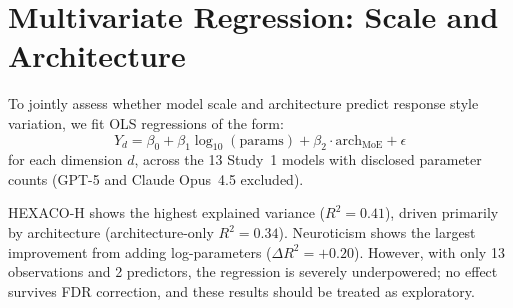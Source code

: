 \documentclass[11pt]{article}
\begin{document}
\section{Multivariate Regression: Scale and Architecture}
\label{sec:appendix_regression}

To jointly assess whether model scale and architecture predict response style variation, we fit OLS regressions of the form:
\begin{equation}
Y_d = \beta_0 + \beta_1 \log_{10}(\text{params}) + \beta_2 \cdot \text{arch}_{\text{MoE}} + \epsilon
\end{equation}
for each dimension $d$, across the 13 Study~1 models with disclosed parameter counts (GPT-5 and Claude Opus~4.5 excluded).

\begin{table}[!htb]
\centering
\caption{OLS regression: dimension score $\sim \log_{10}(\text{params}) +$ architecture ($n = 13$). Dense = 0, MoE = 1. No effect survives FDR correction across 18 tests (9 dimensions $\times$ 2 predictors).}
\label{tab:regression}
\end{table}

HEXACO-H shows the highest explained variance ($R^2 = 0.41$), driven primarily by architecture (architecture-only $R^2 = 0.34$).
Neuroticism shows the largest improvement from adding log-parameters ($\Delta R^2 = +0.20$).
However, with only 13 observations and 2 predictors, the regression is severely underpowered; no effect survives FDR correction, and these results should be treated as exploratory.
\end{document}
